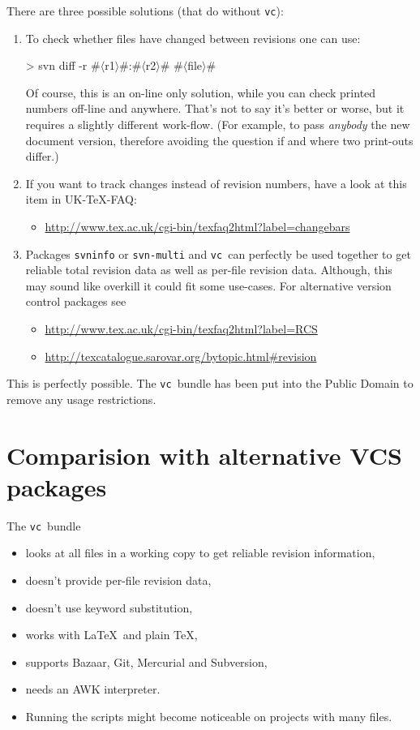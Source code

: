 \documentclass[11pt]{article}
\newcommand*{\pkg}{\texttt{vc}}
\newcommand*{\descr}[1]{$\langle$#1$\rangle$}
\begin{document}
There are three possible solutions (that do without \pkg):
\begin{enumerate}
\item To check whether files have changed between revisions one can use:
\begin{listing}[style=shell, escapechar=\#]
> svn diff -r #\descr{r1}#:#\descr{r2}# #\descr{file}#
\end{listing}
Of course, this is an on-line only solution, while you can check printed
numbers off-line and anywhere.  That's not to say it's better or worse,
but it requires a slightly different work-flow.  (For example, to pass
\emph{anybody} the new document version, therefore avoiding the question
if and where two print-outs differ.)

\item If you want to track changes instead of revision numbers, have a
  look at this item in UK-TeX-FAQ:
  \begin{itemize}
  \item \url{http://www.tex.ac.uk/cgi-bin/texfaq2html?label=changebars}
  \end{itemize}

\item Packages \texttt{svninfo} or \texttt{svn-multi} and \pkg\ can
  perfectly be used together to get reliable total revision data as well
  as per-file revision data.  Although, this may sound like overkill it
  could fit some use-cases.  For alternative version control packages
  see
  \begin{itemize}
  \item \url{http://www.tex.ac.uk/cgi-bin/texfaq2html?label=RCS}
  \item \url{http://texcatalogue.sarovar.org/bytopic.html#revision}
  \end{itemize}
\end{enumerate}

 This is perfectly possible.  The \pkg\ bundle has
been put into the Public Domain to remove any usage restrictions.



\section{Comparision with alternative VCS packages}
\label{sec:comparision}
The \pkg\ bundle
\begin{itemize}
\item looks at all files in a working copy to get reliable revision
  information,
\item doesn't provide per-file revision data,
\item doesn't use keyword substitution,
\item works with \LaTeX\ and plain \TeX,
\item supports Bazaar, Git, Mercurial and Subversion,
\item needs an AWK interpreter.
\item Running the scripts might become noticeable on projects with many
  files.
\end{itemize}
\end{document}
